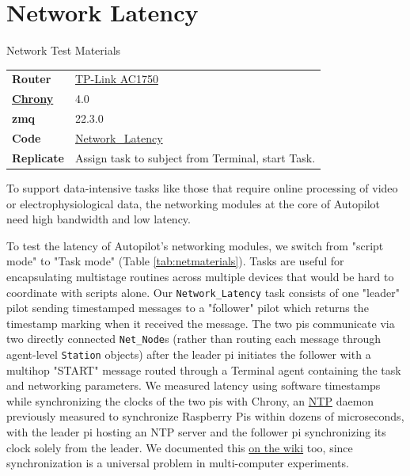 
\section{Network Latency}
\label{sec:networklatency}


\begin{margintable}[2.3cm]
\caption{Network Test Materials}
\label{tab:netmaterials}
\noindent\begin{tabularx}{\linewidth}{lX}%
\toprule
\textbf{Router} & \href{https://www.tp-link.com/us/home-networking/wifi-router/archer-c7/}{TP-Link AC1750} \\
\href{https://wiki.auto-pi-lot.com/index.php/NTP}{\textbf{Chrony}} & 4.0 \\
\textbf{zmq} & 22.3.0 \\
\textbf{Code} & \href{https://github.com/auto-pi-lot/plugin-paper/blob/main/plugin_paper/tasks/network.py}{Network\_Latency} \\
\textbf{Replicate} & Assign task to subject from Terminal, start Task. \\
\bottomrule
\end{tabularx}
\end{margintable}

To support data-intensive tasks like those that require online processing of video or electrophysiological data, the networking modules at the core of Autopilot need high bandwidth and low latency. 

To test the latency of Autopilot's networking modules, we switch from "script mode" to "Task mode" (Table \ref{tab:netmaterials}). Tasks are useful for encapsulating multistage routines across multiple devices that would be hard to coordinate with scripts alone. Our \texttt{Network\_Latency} task consists of one "leader" pilot sending timestamped messages to a "follower" pilot which returns the timestamp marking when it received the message. The two pis communicate via two directly connected \texttt{Net\_Node}s (rather than routing each message through agent-level \texttt{Station} objects) after the leader pi initiates the follower with a multihop "START" message routed through a Terminal agent containing the task and networking parameters. We measured latency using software timestamps while synchronizing the clocks of the two pis with Chrony, an \href{https://en.wikipedia.org/wiki/Network\_Time\_Protocol}{NTP} daemon previously measured to synchronize Raspberry Pis within dozens of microseconds\citep{soaresAnalysisTimekeepingExperimentation2020}, with the leader pi hosting an NTP server and the follower pi synchronizing its clock solely from the leader. We documented this \href{https://wiki.auto-pi-lot.com/index.php/NTP}{on the wiki} too, since synchronization is a universal problem in multi-computer experiments.


